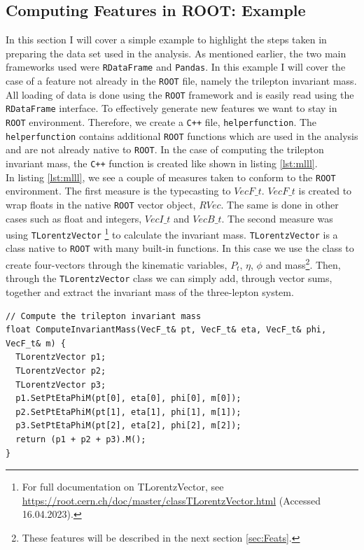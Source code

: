 \subsection{Computing Features in ROOT: Example}
In this section I will cover a simple example to highlight the steps taken in preparing the data set 
used in the analysis. As mentioned earlier, the two main frameworks used were \verb!RDataFrame! and \verb!Pandas!. 
In this example I will cover the case of a feature not already in the \verb!ROOT! file, namely the trilepton
invariant mass. All loading of data is done using the \verb!ROOT! framework and is easily read using the
\verb!RDataFrame! interface. To effectively generate new features we want to stay in \verb!ROOT! environment. Therefore,
we create a \verb!C++! file, \texttt{helperfunction}. The \texttt{helperfunction} contains additional 
\verb!ROOT! functions which are used in the analysis and are not already native to \verb!ROOT!. In the case 
of computing the trilepton invariant mass, the \verb!C++! function is created like shown in listing 
\ref{lst:mlll}.
\\
In listing \ref{lst:mlll}, we see a couple of measures taken to conform to the \verb!ROOT! environment. The first measure is 
the typecasting to $VecF\_t$. $VecF\_t$ is created to wrap floats in the native \verb!ROOT! vector object, $RVec$. 
The same is done in other cases such as float and integers, $VecI\_t$ and $VecB\_t$. The second measure
was using \verb!TLorentzVector! \footnote{For full documentation on TLorentzVector, see \url{https://root.cern.ch/doc/master/classTLorentzVector.html} (Accessed 16.04.2023).} 
to calculate the invariant mass. \verb!TLorentzVector! is a class native to \verb!ROOT! with many built-in functions. In 
this case we use the class to create four-vectors through the kinematic variables, $P_t$, $\eta$, $\phi$ and mass\footnote{These features
will be described in the next section \ref{sec:Feats}.}. Then, through the \verb!TLorentzVector! class we can simply add, through vector sums, 
together and extract the invariant mass of the three-lepton system. 
\lstset{style=Cpp}
\begin{lstlisting}[caption={$C{++}$-function which implementes the calculation of $M_{lll}$.},captionpos=b, label={lst:mlll}]
// Compute the trilepton invariant mass 
float ComputeInvariantMass(VecF_t& pt, VecF_t& eta, VecF_t& phi, VecF_t& m) {
  TLorentzVector p1;
  TLorentzVector p2;
  TLorentzVector p3;
  p1.SetPtEtaPhiM(pt[0], eta[0], phi[0], m[0]);
  p2.SetPtEtaPhiM(pt[1], eta[1], phi[1], m[1]);
  p3.SetPtEtaPhiM(pt[2], eta[2], phi[2], m[2]);
  return (p1 + p2 + p3).M();
}
\end{lstlisting}
